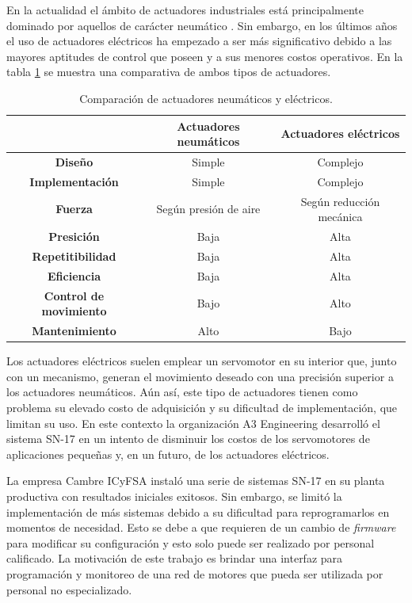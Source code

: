 En la actualidad el ámbito de actuadores industriales está principalmente dominado por aquellos de carácter neumático \citep{web_actuator_market}. Sin embargo, en los últimos años el uso de actuadores eléctricos ha empezado a ser más significativo debido a las mayores aptitudes de control que poseen y a sus menores costos operativos\citep{web_comparacion_actuadores}. En la tabla \ref{tab:comparacion_neumatico_electrico} se muestra una comparativa de ambos tipos de actuadores.

\begin{table}[htpb]
	\centering
	\caption[Comparación de actuadores neumáticos y eléctricos]{Comparación de actuadores neumáticos y eléctricos.}
	\begin{tabular}{c  c  c}    
		\toprule
		 	 & \textbf{Actuadores neumáticos}  & \textbf{Actuadores eléctricos}\\
		\midrule
		\textbf{Diseño} 			& Simple 		& Complejo  \\
		\textbf{Implementación} 	& Simple 		& Complejo \\			
		\textbf{Fuerza} 			& Según presión de aire	& Según reducción mecánica \\
		\textbf{Presición}			& Baja 	& Alta \\
		\textbf{Repetitibilidad}	& Baja 	& Alta \\
		\textbf{Eficiencia}			& Baja 	& Alta \\
		\textbf{Control de movimiento}	& Bajo 	& Alto \\
		\textbf{Mantenimiento}	& Alto 	& Bajo \\
		\bottomrule
		\hline
	\end{tabular}
	\label{tab:comparacion_neumatico_electrico}
\end{table}

Los actuadores eléctricos suelen emplear un servomotor en su interior que, junto con un mecanismo, generan el movimiento deseado con una precisión superior a los actuadores neumáticos. Aún así, este tipo de actuadores tienen como problema su elevado costo de adquisición y su dificultad de implementación, que limitan su uso. En este contexto la organización A3 Engineering desarrolló el sistema SN-17 en un intento de disminuir los costos de los servomotores de aplicaciones pequeñas y, en un futuro, de los actuadores eléctricos.

La empresa Cambre ICyFSA instaló una serie de sistemas SN-17 en su planta productiva con resultados iniciales exitosos. Sin embargo, se limitó la implementación de más sistemas debido a su dificultad para reprogramarlos en momentos de necesidad. Esto se debe a que requieren de un cambio de \textit{firmware} para modificar su configuración y esto solo puede ser realizado por personal calificado. La motivación de este trabajo es brindar una interfaz para programación y monitoreo de una red de motores que pueda ser utilizada por personal no especializado.


